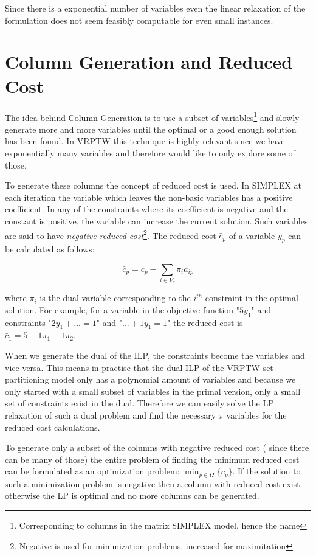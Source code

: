 Since there is a exponential number of variables even the linear relaxation of the formulation does not seem feasibly computable for even small instances.

\section{Column Generation and Reduced Cost}
The idea behind Column Generation is to use a subset of variables\footnote{Corresponding to columns in the matrix SIMPLEX model, hence the name} and slowly generate more and more variables until the optimal or a good enough solution has been found. In VRPTW this technique is highly relevant since we have exponentially many variables and therefore would like to only explore some of those.

To generate these columns the concept of reduced cost is used. In SIMPLEX at each iteration the variable which leaves the non-basic variables has a positive coefficient. In any of the constraints where its coefficient is negative and the constant is positive, the variable can increase the current solution. Such variables are said to have \textit{negative reduced cost}\footnote{Negative is used for minimization problems, increased for maximitation}. The reduced cost $\bar{c}_p$ of a variable $y_p$ can be calculated as follows:

 $$\bar{c}_p = c_p - \sum_{i \in V_c} \pi_i a_{ip}$$
 
where $\pi_i$ is the dual variable corresponding to the $i^{th}$ constraint in the optimal solution. For example, for a variable in the objective function "$5y_1$" and constraints "$2y_1 + ... = 1$" and "$... + 1y_1 = 1$" the reduced cost is $\bar{c}_1 = 5 - 1 \pi_1 - 1 \pi_2$. 

When we generate the dual of the ILP, the constraints become the variables and vice versa. This means in practise that the dual ILP of the VRPTW set partitioning model only has a polynomial amount of variables and because we only started with a small subset of variables in the primal version, only a small set of constraints exist in the dual. Therefore we can easily solve the LP relaxation of such a dual problem and find the necessary $\pi$ variables for the reduced cost calculations.

To generate only a subset of the columns with negative reduced cost ( since there can be many of those) the entire problem of finding the minimum reduced cost can be formulated as an optimization problem: $\displaystyle \min_{p\in \Omega} \{\bar{c}_p\}$. If the solution to such a minimization problem is negative then a column with reduced cost exist otherwise the LP is optimal and no more columns can be generated. 

